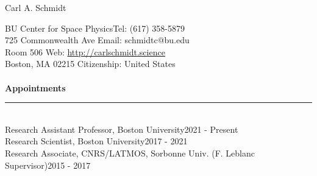 \documentclass[12pt]{report}
\begin{document}
\newpage  
{\noindent}{\Large Carl A. Schmidt} \\ %
%
%

%
\thispagestyle{myheadings}

\noindent BU Center for Space Physics\hfill Tel: (617) 358-5879\\
725 Commonwealth Ave \hfill Email: schmidtc@bu.edu\\
Room 506 \hfill Web: \url{http://carlschmidt.science}\\
Boston, MA 02215 \hfill Citizenship: United States\\
\vspace{2 mm}\\
\bf{Appointments}\rm\\
\rule{\textwidth}{1pt}\\
\noindent Research Assistant Professor, Boston University\hfill 2021 - Present\\
\noindent Research Scientist, Boston University\hfill 2017 - 2021\\
\noindent Research Associate, CNRS/LATMOS, Sorbonne Univ. (F. Leblanc Supervisor)\hfill 2015 - 2017\\
\end{document}
